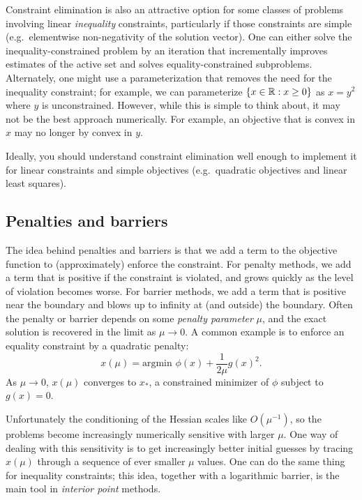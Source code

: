 \documentclass[12pt, leqno]{article}
\begin{document}
Constraint elimination is also an attractive option for some classes
of problems involving linear {\em inequality} constraints,
particularly if those constraints are simple (e.g.~elementwise
non-negativity of the solution vector).  One can either solve
the inequality-constrained problem by an iteration that incrementally
improves estimates of the active set and solves equality-constrained
subproblems.  Alternately, one might use a parameterization that
removes the need for the inequality constraint; for example, we
can parameterize $\{ x \in \mathbb{R} : x \geq 0 \}$ as $x = y^2$ where
$y$ is unconstrained.  However, while this is simple to think about,
it may not be the best approach numerically.  For example, an
objective that is convex in $x$ may no longer by convex in $y$.

Ideally, you should understand constraint elimination well enough to
implement it for linear constraints and simple objectives
(e.g.~quadratic objectives and linear least squares).

\subsection{Penalties and barriers}

The idea behind penalties and barriers is that we add a term to
the objective function to (approximately) enforce the constraint.
For penalty methods, we add a term that is positive if the constraint
is violated, and grows quickly as the level of violation becomes
worse.  For barrier methods, we add a term that is positive near the
boundary and blows up to infinity at (and outside) the boundary.
Often the penalty or barrier depends on some {\em penalty parameter} $\mu$,
and the exact solution is recovered in the limit as $\mu \rightarrow 0$.
A common example is to enforce an equality constraint by a quadratic
penalty:
\[
  x(\mu) = \mbox{argmin } \phi(x) + \frac{1}{2\mu} g(x)^2.
\]
As $\mu \rightarrow 0$, $x(\mu)$ converges to $x_*$, a constrained
minimizer of $\phi$ subject to $g(x) = 0$.

Unfortunately the conditioning of the Hessian scales like
$O(\mu^{-1})$, so the problems become increasingly numerically
sensitive with larger $\mu$.  One way of dealing with this sensitivity
is to get increasingly better initial guesses by tracing $x(\mu)$
through a sequence of ever smaller $\mu$ values.  One can do the same
thing for inequality constraints; this idea, together with a
logarithmic barrier, is the main tool in {\em interior point} methods.
\end{document}
